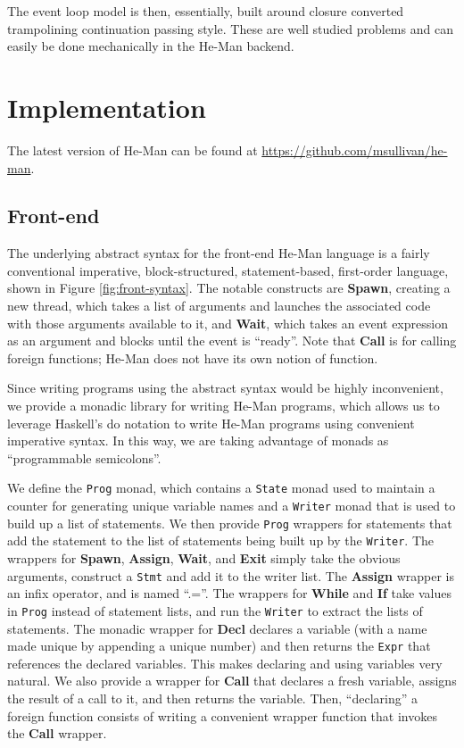 \documentclass[preprint]{sigplanconf}
\renewcommand{\t}{\texttt}
\renewcommand{\b}{\textbf}
\begin{document}
The event loop model is then, essentially, built around closure
converted trampolining continuation passing style. These are well
studied problems and can easily be done mechanically in the He-Man
backend.

\cite{*}

\section{Implementation}

The latest version of He-Man can be found at
\url{https://github.com/msullivan/he-man}.

\subsection{Front-end}

The underlying abstract syntax for the front-end He-Man language is a
fairly conventional imperative, block-structured, statement-based,
first-order language, shown in Figure \ref{fig:front-syntax}. The
notable constructs are \b{Spawn}, creating a new thread, which takes a
list of arguments and launches the associated code with those
arguments available to it, and \b{Wait}, which takes an event
expression as an argument and blocks until the event is
``ready''. Note that \b{Call} is for calling foreign functions; He-Man
does not have its own notion of function.

Since writing programs using the abstract syntax would be highly
inconvenient, we provide a monadic library for writing He-Man
programs, which allows us to leverage Haskell's do notation to write
He-Man programs using convenient imperative syntax. In this way, we
are taking advantage of monads as ``programmable semicolons''.

We define the \t{Prog} monad, which contains a \t{State} monad used to
maintain a counter for generating unique variable names and a
\t{Writer} monad that is used to build up a list of statements. We
then provide \t{Prog} wrappers for statements that add the statement
to the list of statements being built up by the \t{Writer}. The
wrappers for \b{Spawn}, \b{Assign}, \b{Wait}, and \b{Exit} simply take
the obvious arguments, construct a \t{Stmt} and add it to the writer
list. The \b{Assign} wrapper is an infix operator, and is named
``.=''. The wrappers for \b{While} and \b{If} take values in \t{Prog}
instead of statement lists, and run the \t{Writer} to extract the
lists of statements. The monadic wrapper for \b{Decl} declares a
variable (with a name made unique by appending a unique number) and
then returns the \t{Expr} that references the declared variables. This
makes declaring and using variables very natural. We also provide a
wrapper for \b{Call} that declares a fresh variable, assigns the
result of a call to it, and then returns the variable. Then,
``declaring'' a foreign function consists of writing a convenient
wrapper function that invokes the \b{Call} wrapper.
\end{document}
